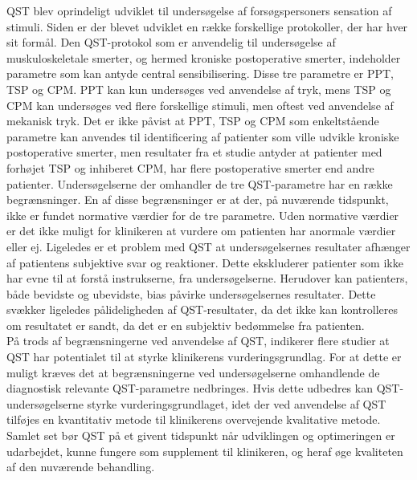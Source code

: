 QST blev oprindeligt udviklet til undersøgelse af forsøgspersoners sensation af stimuli. Siden er der blevet udviklet en række forskellige protokoller, der har hver sit formål. Den QST-protokol som er anvendelig til undersøgelse af muskuloskeletale smerter, og hermed kroniske postoperative smerter, indeholder parametre som kan antyde central sensibilisering. Disse tre parametre er PPT, TSP og CPM. PPT kan kun undersøges ved anvendelse af tryk, mens TSP og CPM kan undersøges ved flere forskellige stimuli, men oftest ved anvendelse af mekanisk tryk. Det er ikke påvist at PPT, TSP og CPM som enkeltstående parametre kan anvendes til identificering af patienter som ville udvikle kroniske postoperative smerter, men resultater fra et studie antyder at patienter med forhøjet TSP og inhiberet CPM, har flere postoperative smerter end andre patienter. Undersøgelserne der omhandler de tre QST-parametre har en række begrænsninger. En af disse begrænsninger er at der, på nuværende tidspunkt, ikke er fundet normative værdier for de tre parametre. Uden normative værdier er det ikke muligt for klinikeren at vurdere om patienten har anormale værdier eller ej. Ligeledes er et problem med QST at undersøgelsernes resultater afhænger af patientens subjektive svar og reaktioner. Dette ekskluderer patienter som ikke har evne til at forstå instrukserne, fra undersøgelserne. Herudover kan patienters, både bevidste og ubevidste, bias påvirke undersøgelsernes resultater. Dette svækker ligeledes pålideligheden af QST-resultater, da det ikke kan kontrolleres om resultatet er sandt, da det er en subjektiv bedømmelse fra patienten. \\
På trods af begrænsningerne ved anvendelse af QST, indikerer flere studier at QST har potentialet til at styrke klinikerens vurderingsgrundlag. For at dette er muligt kræves det at begrænsningerne ved undersøgelserne omhandlende de diagnostisk relevante QST-parametre nedbringes. Hvis dette udbedres kan QST-undersøgelserne styrke vurderingsgrundlaget, idet der ved anvendelse af QST tilføjes en kvantitativ metode til klinikerens overvejende kvalitative metode. Samlet set bør QST på et givent tidspunkt når udviklingen og optimeringen er udarbejdet, kunne fungere som supplement til klinikeren, og heraf øge kvaliteten af den nuværende behandling.


